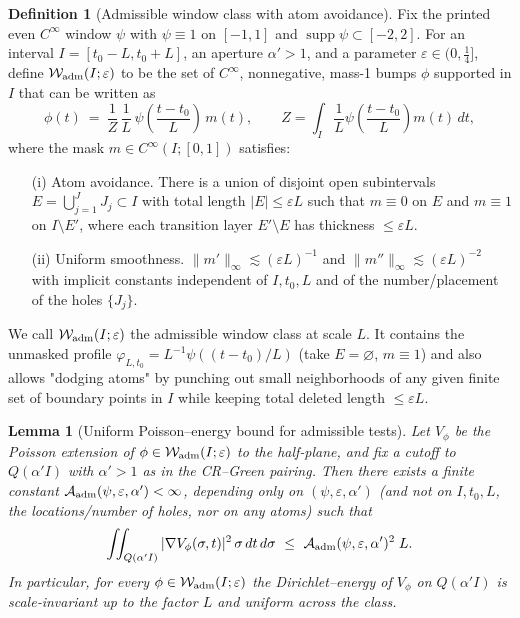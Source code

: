 \documentclass[11pt]{article}
\newtheorem{lemma}[theorem]{Lemma}
\theoremstyle{definition}
\newtheorem{definition}[theorem]{Definition}
\theoremstyle{remark}
\begin{document}
\begin{definition}[Admissible window class with atom avoidance]\label{def:adm-bumps}
Fix the printed even $C^\infty$ window $\psi$ with $\psi\equiv1$ on $[-1,1]$ and $\operatorname{supp}\psi\subset[-2,2]$. For an interval $I=[t_0-L,t_0+L]$, an aperture $\alpha'>1$, and a parameter $\varepsilon\in(0,\tfrac14]$, define $\mathcal W_{\rm adm}(I;\varepsilon)$ to be the set of $C^\infty$, nonnegative, mass-1 bumps $\phi$ supported in $I$ that can be written as
\[
  \phi(t)\ =\ \frac{1}{Z}\,\frac{1}{L}\,\psi\!\left(\frac{t-t_0}{L}\right)\,m(t),\qquad Z=\int_I \frac1L\psi\!\left(\frac{t-t_0}{L}\right)m(t)\,dt,
\]
where the mask $m\in C^\infty(I;[0,1])$ satisfies:
\begin{itemize}
\item[(i)] Atom avoidance. There is a union of disjoint open subintervals $E=\bigcup_{j=1}^{J} J_j\subset I$ with total length $|E|\le \varepsilon L$ such that $m\equiv0$ on $E$ and $m\equiv1$ on $I\setminus E'$, where each transition layer $E'\setminus E$ has thickness $\le \varepsilon L$.
\item[(ii)] Uniform smoothness. $\|m'\|_\infty\lesssim (\varepsilon L)^{-1}$ and $\|m''\|_\infty\lesssim (\varepsilon L)^{-2}$ with implicit constants independent of $I,t_0,L$ and of the number/placement of the holes $\{J_j\}$.
\end{itemize}
We call $\mathcal W_{\rm adm}(I;\varepsilon)$ the admissible window class at scale $L$. It contains the unmasked profile $\varphi_{L,t_0}=L^{-1}\psi((t-t_0)/L)$ (take $E=\varnothing$, $m\equiv1$) and also allows "dodging atoms" by punching out small neighborhoods of any given finite set of boundary points in $I$ while keeping total deleted length $\le\varepsilon L$.
\end{definition}

\begin{lemma}[Uniform Poisson–energy bound for admissible tests]\label{lem:uniform-test-energy}
Let $V_\phi$ be the Poisson extension of $\phi\in\mathcal W_{\rm adm}(I;\varepsilon)$ to the half‑plane, and fix a cutoff to $Q(\alpha' I)$ with $\alpha'>1$ as in the CR–Green pairing. Then there exists a finite constant $\mathcal A_{\rm adm}(\psi,\varepsilon,\alpha')<\infty$, depending only on $(\psi,\varepsilon,\alpha')$ (and not on $I,t_0,L$, the locations/number of holes, nor on any atoms) such that
\[
  \iint_{Q(\alpha' I)} |\nabla V_\phi(\sigma,t)|^2\,\sigma\,dt\,d\sigma\ \le\ \mathcal A_{\rm adm}(\psi,\varepsilon,\alpha')^2\; L.
\]
In particular, for every $\phi\in\mathcal W_{\rm adm}(I;\varepsilon)$ the Dirichlet–energy of $V_\phi$ on $Q(\alpha' I)$ is scale‑invariant up to the factor $L$ and uniform across the class.
\end{lemma}
\end{document}
